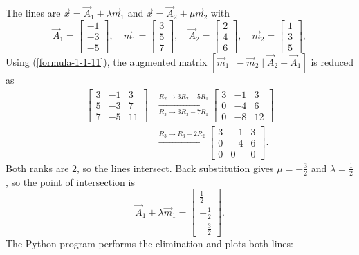 \begin{enumerate}[label={},font=\normalfont,leftmargin=1.15cm,labelwidth=1.0cm,labelsep=0.15cm,itemindent=0pt,listparindent=0pt,itemsep=\baselineskip,parsep=0pt,topsep=0pt]
\vspace{0.6em}\par\solution

The lines are $\vec{x}=\vec{A}_1+\lambda\vec{m}_1$ and $\vec{x}=\vec{A}_2+\mu\vec{m}_2$ with
\[
\vec{A}_1=\begin{bmatrix}-1\\-3\\-5\end{bmatrix},\quad\vec{m}_1=\begin{bmatrix}3\\5\\7\end{bmatrix},\quad\vec{A}_2=\begin{bmatrix}2\\4\\6\end{bmatrix},\quad\vec{m}_2=\begin{bmatrix}1\\3\\5\end{bmatrix},
\]
Using (\ref{formula-1-1-11}), the augmented matrix $[\vec{m}_1\;\;-\vec{m}_2\mid\vec{A}_2-\vec{A}_1]$ is reduced as
\[
\begin{aligned}
\left[\begin{array}{cc|c}3&-1&3\\5&-3&7\\7&-5&11\end{array}\right]
&\xrightarrow[R_3\to3R_3-7R_1]{R_2\to3R_2-5R_1}
\left[\begin{array}{cc|c}3&-1&3\\0&-4&6\\0&-8&12\end{array}\right]\\
&\xrightarrow{R_3\to R_3-2R_2}
\left[\begin{array}{cc|c}3&-1&3\\0&-4&6\\0&0&0\end{array}\right].
\end{aligned}
\]
Both ranks are $2$, so the lines intersect. Back substitution gives $\mu=-\frac{3}{2}$ and $\lambda=\frac{1}{2}$, so the point of intersection is
\[
\vec{A}_1+\lambda\vec{m}_1=\boxed{\begin{bmatrix}\frac{1}{2}\\-\frac{1}{2}\\-\frac{3}{2}\end{bmatrix}}.
\]
The Python program performs the elimination and plots both lines:

\end{enumerate}
